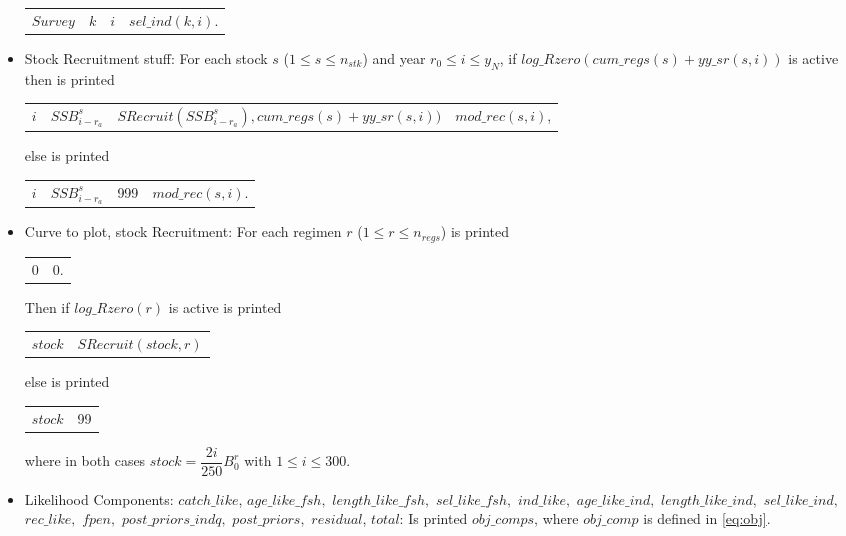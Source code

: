 \documentclass{article}
\begin{document}
\begin{itemize}
     \begin{center}
         \begin{tabular}{c c c c}
           $Survey$   & $k$ & $i$ & $sel\_ind(k,i)$. \\
         \end{tabular}
     \end{center}
    \item Stock Recruitment stuff: For each stock $s$ ($1\leq s\leq n_{stk}$) and year $r_0\leq i \leq y_N$, if $log\_Rzero(cum\_regs(s)+yy\_sr(s,i))$ is active then is printed 
    \begin{center}
        \begin{tabular}{c c c c }
          $i$   & $SSB^s_{i-r_a}$  & $SRecruit(SSB^s_{i-r_a}),cum\_regs(s)+yy\_sr(s,i))$ & $mod\_rec(s,i)$,\\
        \end{tabular}
    \end{center}
    else 
    is printed
    \begin{center}
        \begin{tabular}{c c c c}
            $i$ &  $SSB^s_{i-r_a}$ & 999 & $mod\_rec(s,i)$.\\
        \end{tabular}
    \end{center}
    \item Curve to plot, stock Recruitment:  For each regimen $r$ ($1\leq r \leq n_{regs}$) is printed
\begin{center}
    \begin{tabular}{c c}
        0 & 0. \end{tabular}
\end{center}
Then if $log\_Rzero(r)$ is active is printed
\begin{center}
    \begin{tabular}{c c}
        $stock$ &  $SRecruit(stock, r)$ \end{tabular}
\end{center}
else is printed

\begin{center}
    \begin{tabular}{c c}
        $stock$ &  99 \\

    \end{tabular}
\end{center}
where in both cases $stock=\dfrac{2i}{250}B_0^r$ with $1\leq i \leq 300$.
    \item Likelihood Components: $catch\_like$, $age\_like\_fsh,$ $length\_like\_fsh,$ $sel\_like\_fsh,$ $ind\_like,$ $age\_like\_ind,$ $length\_like\_ind,$ $sel\_like\_ind,$ $rec\_like,$ $fpen,$ $post\_priors\_indq,$ $post\_priors,$ $residual$, $total$: Is printed $obj\_comps$, where $obj\_comp$ is defined in \ref{eq:obj}.
    

\end{itemize}
\end{document}
